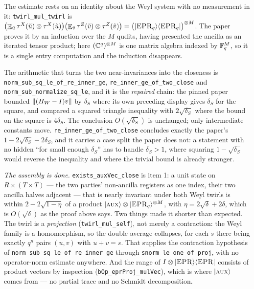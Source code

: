 The estimate rests on an identity about the Weyl system with no measurement in it:
\texttt{twirl\_mul\_twirl} is
$\bigl( \mathop{\mathbb{E}}_{\tilde{u}} \tau^X(\tilde{u}) \otimes \tau^X(\tilde{u}) \bigr)
 \bigl( \mathop{\mathbb{E}}_{\tilde{v}} \tau^Z(\tilde{v}) \otimes \tau^Z(\tilde{v}) \bigr)
 = \bigl( |\textsc{EPR}_q\rangle \langle\textsc{EPR}_q| \bigr)^{\otimes M}$. The paper proves it by an induction over the $M$ qudits, having
presented the ancilla as an iterated tensor product; here $(\mathbb{C}^q)^{\otimes M}$ is one matrix algebra
indexed by $\mathbb{F}_q^M$, so it is a single entry computation and the induction disappears.

The arithmetic that turns the two near-invariances into the closeness is
\texttt{norm\_sub\_sq\_le\_of\_re\_inner\_ge}, \texttt{re\_inner\_ge\_of\_two\_close} and
\texttt{norm\_sub\_normalize\_sq\_le}, and it is the \emph{repaired} chain: the pinned paper bounded
$\left\| {(H_W - I) v} \right\|$ by $\delta_S$ where its own preceding display gives $\delta_S$ for the
square, and compared a squared triangle inequality with $2\sqrt{\delta_S}$ where the bound on the
square is $4 \delta_S$. The conclusion $O(\sqrt{\delta_S})$ is unchanged; only intermediate
constants move. \texttt{re\_inner\_ge\_of\_two\_close} concludes exactly the paper's
$1 - 2\sqrt{\delta_S} - 2\delta_S$, and it carries a case split the paper does not: a statement with
no hidden ``for small enough $\delta_S$'' has to handle $\delta_S > 1$, where squaring
$1 - \sqrt{\delta_S}$ would reverse the inequality and where the trivial bound is already stronger.

\emph{The assembly is done.} \texttt{exists\_auxVec\_close} is item 1: a unit state on
$R \times (T \times T)$ --- the two parties' non-ancilla registers as one index, their two ancilla
halves adjacent --- that is nearly invariant under both Weyl twirls is within
$2 - 2\sqrt{1 - \eta}$ of a product $|\textsc{aux}\rangle \otimes |\textsc{EPR}_q\rangle^{\otimes M}$, with
$\eta = 2\sqrt{\delta} + 2\delta$, which is $O(\sqrt{\delta})$ as the proof above says. Two
things made it shorter than expected. The twirl is a \emph{projection}
(\texttt{twirl\_mul\_self}), not merely a contraction: the Weyl family is a homomorphism, so the
double average collapses, for each $s$ there being exactly $q^n$ pairs $(u,v)$ with $u + v = s$.
That supplies the contraction hypothesis of \texttt{norm\_sub\_sq\_le\_of\_re\_inner\_ge}
through \texttt{snorm\_le\_one\_of\_proj}, with no operator-norm estimate anywhere. And the
range of $I \otimes |\textsc{EPR}\rangle\langle\textsc{EPR}|$ consists of product vectors by inspection
(\texttt{bOp\_eprProj\_mulVec}), which is where $|\textsc{aux}\rangle$ comes from --- no partial trace and
no Schmidt decomposition.

